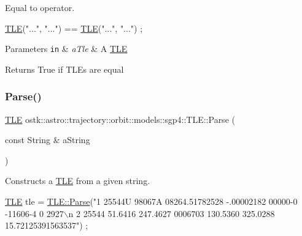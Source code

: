 Equal to operator. 


\begin{DoxyCode}
\hyperlink{classostk_1_1astro_1_1trajectory_1_1orbit_1_1models_1_1sgp4_1_1_t_l_e_a57323db2c24577c2e8ddce79fa776d1e}{TLE}(\textcolor{stringliteral}{"..."}, \textcolor{stringliteral}{"..."}) == \hyperlink{classostk_1_1astro_1_1trajectory_1_1orbit_1_1models_1_1sgp4_1_1_t_l_e_a57323db2c24577c2e8ddce79fa776d1e}{TLE}(\textcolor{stringliteral}{"..."}, \textcolor{stringliteral}{"..."}) ;
\end{DoxyCode}



\begin{DoxyParams}[1]{Parameters}
\mbox{\tt in}  & {\em a\+Tle} & A \hyperlink{classostk_1_1astro_1_1trajectory_1_1orbit_1_1models_1_1sgp4_1_1_t_l_e}{T\+LE} \\
\hline
\end{DoxyParams}
\begin{DoxyReturn}{Returns}
True if T\+L\+Es are equal 
\end{DoxyReturn}
\mbox{\label{classostk_1_1astro_1_1trajectory_1_1orbit_1_1models_1_1sgp4_1_1_t_l_e_a7f97a74af47895aa315aebc52f410d26}} 
\subsubsection{\texorpdfstring{Parse()}{Parse()}}
{\footnotesize\ttfamily \hyperlink{classostk_1_1astro_1_1trajectory_1_1orbit_1_1models_1_1sgp4_1_1_t_l_e}{T\+LE} ostk\+::astro\+::trajectory\+::orbit\+::models\+::sgp4\+::\+T\+L\+E\+::\+Parse (\begin{DoxyParamCaption}\item[{const String \&}]{a\+String }\end{DoxyParamCaption})\hspace{0.3cm}{\ttfamily [static]}}



Constructs a \hyperlink{classostk_1_1astro_1_1trajectory_1_1orbit_1_1models_1_1sgp4_1_1_t_l_e}{T\+LE} from a given string. 


\begin{DoxyCode}
\hyperlink{classostk_1_1astro_1_1trajectory_1_1orbit_1_1models_1_1sgp4_1_1_t_l_e_a57323db2c24577c2e8ddce79fa776d1e}{TLE} tle = \hyperlink{classostk_1_1astro_1_1trajectory_1_1orbit_1_1models_1_1sgp4_1_1_t_l_e_a7f97a74af47895aa315aebc52f410d26}{TLE::Parse}(\textcolor{stringliteral}{"1 25544U 98067A   08264.51782528 -.00002182  00000-0 -11606-4 0  2927\(\backslash\)n}
\textcolor{stringliteral}{                      2 25544  51.6416 247.4627 0006703 130.5360 325.0288 15.72125391563537"}) ;
\end{DoxyCode}



